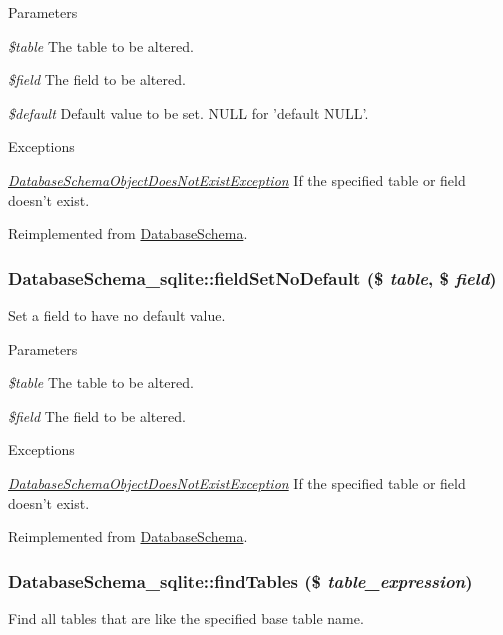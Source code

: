 \begin{DoxyParams}{Parameters}
\item[{\em \$table}]The table to be altered. \item[{\em \$field}]The field to be altered. \item[{\em \$default}]Default value to be set. NULL for 'default NULL'.\end{DoxyParams}

\begin{DoxyExceptions}{Exceptions}
\item[{\em \hyperlink{classDatabaseSchemaObjectDoesNotExistException}{DatabaseSchemaObjectDoesNotExistException}}]If the specified table or field doesn't exist. \end{DoxyExceptions}


Reimplemented from \hyperlink{classDatabaseSchema_a0e7b9c13344b59584bf6e1ddea009592}{DatabaseSchema}.\hypertarget{classDatabaseSchema__sqlite_a607aa7b0fef26ab3dfd08d46103ad4ce}{
\subsubsection[{fieldSetNoDefault}]{\setlength{\rightskip}{0pt plus 5cm}DatabaseSchema\_\-sqlite::fieldSetNoDefault (\$ {\em table}, \/  \$ {\em field})}}
\label{classDatabaseSchema__sqlite_a607aa7b0fef26ab3dfd08d46103ad4ce}
Set a field to have no default value.


\begin{DoxyParams}{Parameters}
\item[{\em \$table}]The table to be altered. \item[{\em \$field}]The field to be altered.\end{DoxyParams}

\begin{DoxyExceptions}{Exceptions}
\item[{\em \hyperlink{classDatabaseSchemaObjectDoesNotExistException}{DatabaseSchemaObjectDoesNotExistException}}]If the specified table or field doesn't exist. \end{DoxyExceptions}


Reimplemented from \hyperlink{classDatabaseSchema_ae4de35c98eed09a4c38d82e3f17ed8a6}{DatabaseSchema}.\hypertarget{classDatabaseSchema__sqlite_a7cfb91db091c6f998be9d660ea5c63ae}{
\subsubsection[{findTables}]{\setlength{\rightskip}{0pt plus 5cm}DatabaseSchema\_\-sqlite::findTables (\$ {\em table\_\-expression})}}
\label{classDatabaseSchema__sqlite_a7cfb91db091c6f998be9d660ea5c63ae}
Find all tables that are like the specified base table name.



